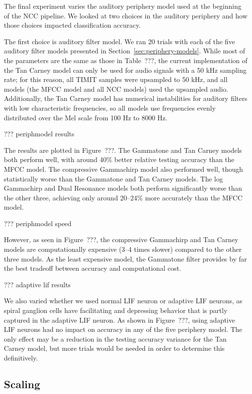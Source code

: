 The final experiment varies the auditory periphery model
used at the beginning of the NCC pipeline.
We looked at two choices in the auditory periphery
and how those choices impacted classification accuracy.

The first choice is auditory filter model.
We ran 20 trials with each of the five
auditory filter models presented
in Section~\ref{sec:periphery-models}.
While most of the parameters are the same
as those in Table~???,
the current implementation of the Tan Carney model
can only be used for audio signals
with a 50 kHz sampling rate;
for this reason, all TIMIT samples
were upsampled to 50 kHz,
and all models (the MFCC model and all NCC models)
used the upsampled audio.
Additionally, the Tan Carney model
has numerical instabilities for auditory filters
with low characteristic frequencies,
so all models use frequencies
evenly distributed over the Mel scale
from 100 Hz to 8000 Hz.

??? periphmodel results

The results are plotted in Figure~???.
The Gammatone and Tan Carney models
both perform well,
with around 40\% better relative testing accuracy
than the MFCC model.
The compressive Gammachirp model
also performed well,
though statistically worse
than the Gammatone and Tan Carney models.
The log Gammachirp and Dual Resonance models
both perform significantly worse
than the other three,
achieving only around 20--24\%
more accurately than the MFCC model.

??? periphmodel speed

However, as seen in Figure~???,
the compressive Gammachirp
and Tan Carney models are
computationally expensive
(3--4 times slower)
compared to the other three models.
As the least expensive model,
the Gammatone filter
provides by far the best tradeoff
between accuracy and computational cost.

??? adaptive lif results

We also varied whether we used
normal LIF neuron or adaptive LIF neurons,
as spiral ganglion cells
have facilitating and depressing behavior
that is partly captured in the adaptive LIF neuron.
As shown in Figure~???,
using adaptive LIF neurons had no impact
on accuracy in any of the five periphery model.
The only effect may be a reduction
in the testing accuracy variance
for the Tan Carney model,
but more trials would be needed
in order to determine this definitively.

\subsection{Scaling}

